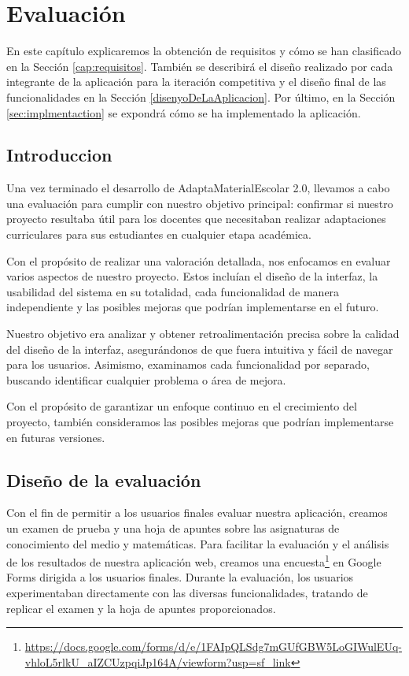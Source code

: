 \chapter{Evaluación}
\label{cap:evaluacion}
En este capítulo explicaremos la obtención de requisitos y cómo se han clasificado en la Sección \ref{cap:requisitos}. También se describirá el diseño realizado por cada integrante de la aplicación para la iteración competitiva y el diseño final de las funcionalidades en la Sección \ref{disenyoDeLaAplicacion}. Por último, en la Sección \ref{sec:implmentaction} se expondrá cómo se ha implementado la aplicación.

\section{Introduccion}\label{sec:introEvaluacion}
Una vez terminado el desarrollo de AdaptaMaterialEscolar 2.0, llevamos a cabo una evaluación para cumplir con nuestro objetivo principal: confirmar si nuestro proyecto resultaba útil para los docentes que necesitaban realizar adaptaciones curriculares para sus estudiantes en cualquier etapa académica.

Con el propósito de realizar una valoración detallada, nos enfocamos en evaluar varios aspectos de nuestro proyecto. Estos incluían el diseño de la interfaz, la usabilidad del sistema en su totalidad, cada funcionalidad de manera independiente y las posibles mejoras que podrían implementarse en el futuro.

Nuestro objetivo era analizar y obtener retroalimentación precisa sobre la calidad del diseño de la interfaz, asegurándonos de que fuera intuitiva y fácil de navegar para los usuarios. Asimismo, examinamos cada funcionalidad por separado, buscando identificar cualquier problema o área de mejora.

Con el propósito de garantizar un enfoque continuo en el crecimiento del proyecto, también consideramos las posibles mejoras que podrían implementarse en futuras versiones.

\section{Diseño de la evaluación}\label{sec:disenyoEvaluacion}
Con el fin de permitir a los usuarios finales evaluar nuestra aplicación, creamos un examen de prueba y una hoja de apuntes sobre las asignaturas de conocimiento del medio y matemáticas.
Para facilitar la evaluación y el análisis de los resultados de nuestra aplicación web, creamos una encuesta\footnote{\url{https://docs.google.com/forms/d/e/1FAIpQLSdg7mGUfGBW5LoGIWulEUq-vhloL5rlkU_aIZCUzpqiJp164A/viewform?usp=sf_link}} en Google Forms dirigida a los usuarios finales. Durante la evaluación, los usuarios experimentaban directamente con las diversas funcionalidades, tratando de replicar el examen y la hoja de apuntes proporcionados.

